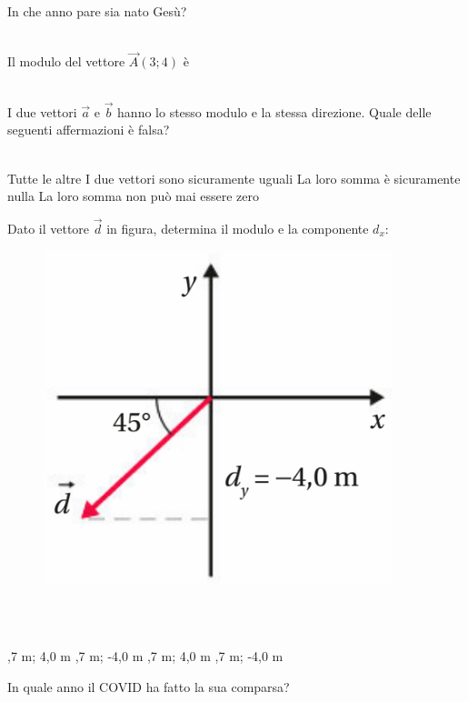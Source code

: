 \documentclass[a4paper,11pt]{exam}
\begin{document}
\begin{questions}
    
\question In che anno pare sia nato Gesù?\\\
\begin{oneparchoices}
  \choice 20
\end{oneparchoices}

    
\question Il modulo del vettore $\vec{A}(3;4)$ è\\\
\begin{oneparchoices}
  \choice 8
\end{oneparchoices}

    
\question I due vettori $\vec{a}$ e $\vec{b}$ hanno lo stesso modulo e la stessa direzione. Quale delle seguenti affermazioni è falsa?\\\
\begin{oneparchoices}
  \choice Tutte le altre
  \choice I due vettori sono sicuramente uguali
  \choice La loro somma è sicuramente nulla
  \choice La loro somma non può mai essere zero
\end{oneparchoices}

    
\question Dato il vettore $\vec{d}$ in figura, determina il modulo e la componente $d_x$: \begin{figure}[h!]   \begin{center}     \includegraphics[scale=0.35]{vettored.png}   \end{center} \end{figure}\\\
\begin{oneparchoices}
  \choice 5,7 m; 4,0 m
  \choice 5,7 m; -4,0 m
  \choice -5,7 m; 4,0 m
  \choice -5,7 m; -4,0 m
\end{oneparchoices}

    
\question In quale anno il COVID ha fatto la sua comparsa?\\\
\begin{oneparchoices}
  \choice 2019
  \choice 2001
\end{oneparchoices}

    
\end{questions}
\end{document}
